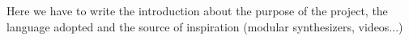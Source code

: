 \documentclass[main.tex]{subfiles}
\begin{document}
Here we have to write the introduction about the purpose of the project, the language adopted and the source of inspiration (modular synthesizers, videos...)\\
\newpage
\end{document}

